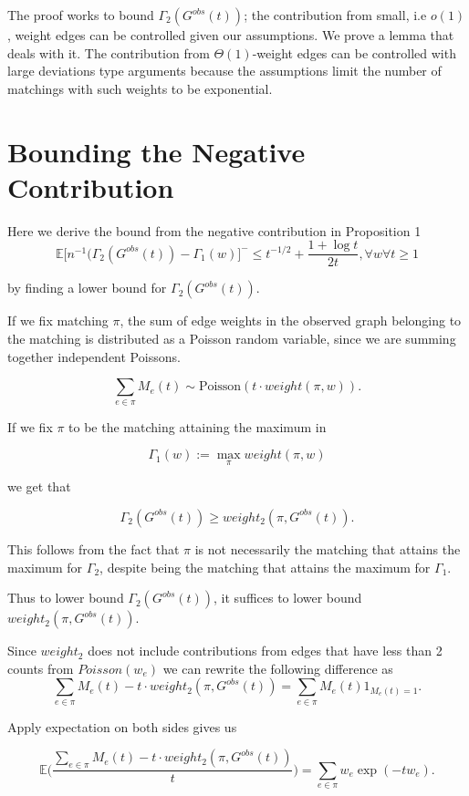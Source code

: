 The proof works to bound $\Gamma_2(G^{obs}(t))$;  the contribution from small, i.e $o(1)$, weight edges can be controlled given our assumptions.  We prove a lemma that deals with it.  The contribution from $\Theta(1)$-weight edges can be controlled with large deviations type arguments because the assumptions limit the number of matchings with such weights to be exponential.  

\section{Bounding the Negative Contribution}

Here we derive the bound from the negative contribution in Proposition 1
$$
\mathbb{E}\bigg[n^{-1}(\Gamma_2(G^{obs}(t))-\Gamma_1(w)\bigg]^- \leq t^{-1/2} + \frac{1+\log t}{2 t},  \forall w \forall t \geq 1
$$

by finding a lower bound for $\Gamma_2(G^{obs}(t))$.

\bigskip

If we fix matching $\pi$, the sum of edge weights in the observed graph belonging to the matching is distributed as a Poisson random variable, since we are summing together independent Poissons.

$$ \sum_{e \in \pi} M_e(t) \sim \text{Poisson}(t\cdot weight(\pi, w)).$$ 

If we fix $\pi$ to be the matching attaining the maximum in 

$$\Gamma_1(w):= \max_{\pi} weight(\pi, w) $$

we get that 

$$ \Gamma_2(G^{obs}(t)) \geq weight_2(\pi, G^{obs}(t)).$$

This follows from the fact that $\pi$ is not necessarily the matching that attains the maximum for $\Gamma_2$, despite being the matching that attains the maximum for $\Gamma_1$.  

Thus to lower bound $ \Gamma_2(G^{obs}(t))$, it suffices to lower bound $weight_2(\pi, G^{obs}(t))$.  

Since $weight_2$ does not include contributions from edges that have less than 2 counts from $Poisson(w_e)$ we can rewrite the following difference as $$ \sum_{e \in \pi}M_e(t) - t\cdot weight_2(\pi, G^{obs}(t)) = \sum_{e \in \pi} M_e(t)1_{M_e(t)=1}.$$

Apply expectation on both sides gives us

$$ \mathbb{E}\bigg(\frac{\sum_{e \in \pi}M_e(t) - t\cdot weight_2(\pi, G^{obs}(t))}{t}\bigg)= \sum_{e \in \pi} w_e \exp(-tw_e).$$

